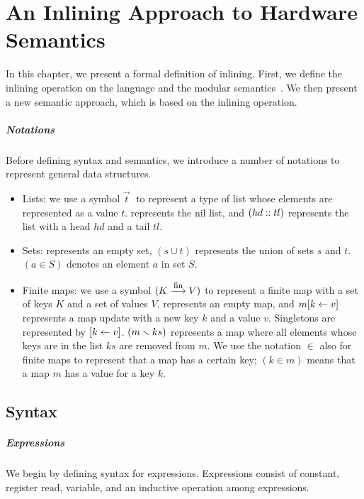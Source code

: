 \chapter{An Inlining Approach to Hardware Semantics}
\label{chap:semantics}

In this chapter, we present a formal definition of inlining.  First,
we define the inlining operation on the \Kami{} language and the
modular semantics~\cite{murali-thesis}. We then present a new semantic
approach, which is based on the inlining operation.

\paragraph{Notations}

Before defining syntax and semantics, we introduce a number of
notations to represent general data structures.
\begin{itemize}
\item Lists: we use a symbol $\vec{t}\;$ to represent a type of list
  whose elements are represented as a value $t$. \listnil{} represents
  the nil list, and $(hd::tl)$ represents the list with a
  head $hd$ and a tail $tl$.
\item Sets: \emptyset{} represents an empty set, $(s \cup t)$
  represents the union of sets $s$ and $t$. $(a \in S)$ denotes an
  element $a$ in set $S$.
\item Finite maps: we use a symbol $(K \stackrel{\textrm{\footnotesize{fin}}}{\longrightarrow} V)$ to represent a
  finite map with a set of keys $K$ and a set of values
  $V$. \emptymap{} represents an empty map, and $m [ k \leftarrow v ]$
  represents a map update with a new key $k$ and a value
  $v$. Singletons are represented by
  $ [ k \leftarrow v ]$. $(m \smallsetminus{} ks)$ represents a map where all
  elements whose keys are in the list $ks$ are removed from $m$. We
  use the notation $\in$ also for finite maps to represent that a map
  has a certain key; $(k \in m)$ means that a map $m$ has a value for
  a key $k$.
\end{itemize}

\section{Syntax}

\paragraph{Expressions}
We begin by defining syntax for expressions. Expressions consist of
constant, register read, variable, and an inductive operation among
expressions.

